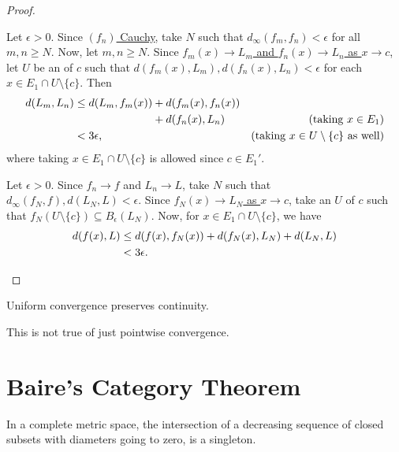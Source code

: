 	\begin{proof}
		\begin{mylist}
			\item Let $\epsilon > 0$. Since \ul{$(f_n)$ Cauchy}, take $N$ such that $d_\infty(f_m, f_n) < \epsilon$ for all $m, n\ge N$. Now, let $m, n\ge N$. Since \ul{$f_m(x)\to L_m$ and $f_n(x)\to L_n$ as $x\to c$}, let $U$ be an \onbd of $c$ such that $d(f_m(x), L_m), d(f_n(x), L_n) < \epsilon$ for each $x\in E_1\cap U\setminus\{c\}$. Then
			\begin{alignat*}{2}
				d(L_m, L_n)
				& \le d(L_m, f_m(x)) + d(f_m(x), f_n(x)) \\
				& \phantom{{}\le d(L_m, f_m(x))} + d(f_n(x), L_n) & \text{(taking $x\in E_1$)}\\
				& < 3\epsilon\text, & \text{(taking $x\in U\setminus \{c\}$ as well)}
			\end{alignat*}
			where taking $x\in E_1\cap U\setminus\{c\}$ is allowed since \ul{$c\in E_1'$}.
			
			
			\item Let $\epsilon > 0$. Since \ul{$f_n\to f$} and \ul{$L_n\to L$}, take $N$ such that $d_\infty(f_N, f), d(L_N, L) < \epsilon$. Since \ul{$f_N(x)\to L_N$ as $x\to c$}, take an \onbd $U$ of $c$ such that $f_N(U\setminus\{c\})\subseteq B_\epsilon(L_N)$. Now, for $x\in E_1\cap U\setminus\{c\}$, we have
			\begin{alignat*}{2}
				d(f(x), L)
				& \le d(f(x), f_N(x)) + d(f_N(x), L_N) + d(L_N, L)\\
				& < 3\epsilon\text. \tag*{\qedhere}
			\end{alignat*}
		\end{mylist}
	\end{proof}
	
	\begin{cor}
		Uniform convergence preserves continuity.
	\end{cor}
	
	\noindent This is \ofc not true of just pointwise convergence.
	
	
	


\section{Baire's Category Theorem}

	\begin{prp}
		In a complete metric space, the intersection of a decreasing sequence of closed subsets with diameters going to zero, is a singleton.
	\end{prp}
	
